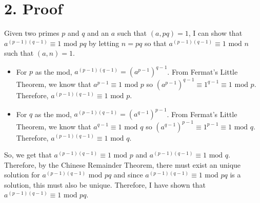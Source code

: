 \documentclass[11pt]{article}
\begin{document}
\newpage
\section*{2. Proof}
Given two primes $p$ and $q$ and an $a$ such that $(a, pq) = 1$, I can show that $a^{(p - 1)(q - 1)} \equiv 1 \text{ mod } pq$ by letting $n = pq$ so that $a^{(p - 1)(q - 1)} \equiv 1 \text{ mod } n$ such that $(a, n) = 1$.
\begin{itemize}
\item
For $p$ as the mod, $a^{(p - 1)(q - 1)} = \left(a^{p - 1}\right)^{q - 1}$. From Fermat's Little Theorem, we know that $a^{p - 1} \equiv 1 \text{ mod } p$ so $\left(a^{p - 1}\right)^{q - 1} \equiv 1^{q - 1} \equiv 1 \text{ mod } p$. Therefore, $a^{(p - 1)(q - 1)} \equiv 1 \text{ mod } p$.
\item
For $q$ as the mod, $a^{(p - 1)(q - 1)} = \left(a^{q - 1}\right)^{p - 1}$. From Fermat's Little Theorem, we know that $a^{q - 1} \equiv 1 \text{ mod } q$ so $\left(a^{q - 1}\right)^{p - 1} \equiv 1^{p - 1} \equiv 1 \text{ mod } q$. Therefore, $a^{(p - 1)(q - 1)} \equiv 1 \text{ mod } q$.
\end{itemize}
So, we get that $a^{(p - 1)(q - 1)} \equiv 1 \text{ mod } p$ and $a^{(p - 1)(q - 1)} \equiv 1 \text{ mod } q$. Therefore, by the Chinese Remainder Theorem, there must exist an unique solution for $a^{(p - 1)(q - 1)} \text{ mod } pq$ and since $a^{(p - 1)(q - 1)} \equiv 1 \text{ mod } pq$ is a solution, this must also be unique. Therefore, I have shown that $a^{(p - 1)(q - 1)} \equiv 1 \text{ mod } pq$.
\end{document}

